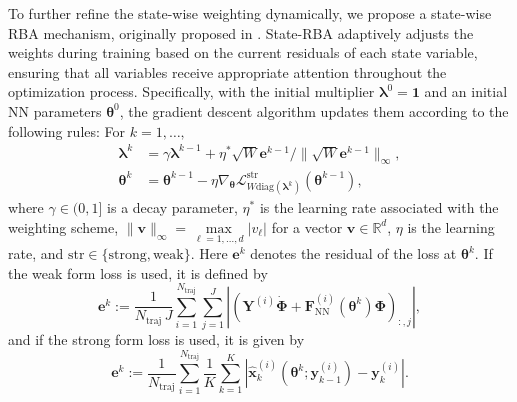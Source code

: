 \documentclass[final]{siamltex}
\newcommand{\bfa}[1]{\boldsymbol{#1}}
\begin{document}
To further refine the state-wise weighting dynamically, we propose a state-wise RBA mechanism, originally proposed in \cite{anagnostopoulos2024residual}. 
State-RBA adaptively adjusts the weights during training based on the current residuals of each state variable, ensuring that all variables receive appropriate attention throughout the optimization process. 
Specifically, with the initial multiplier $\bfa{\lambda}^{0} = \bm{1}$ and an initial NN parameters $\bfa{\theta}^0$, the gradient descent algorithm updates them according to the following rules: For $k=1,\dots,$
\begin{align*}
\bfa{\lambda}^{k}
    &=
    \gamma \bfa{\lambda}^{k-1}
    +
    \eta^{\ast}
    \sqrt{W}\bfa{e}^{k-1}/\|\sqrt{W}\bfa{e}^{k-1}\|_{\infty}, \\
    \bfa{\theta}^{k} &= \bfa{\theta}^{k-1} - \eta \nabla_{\bfa{\theta}} \mathcal{L}^{\textrm{str}}_{W\textrm{diag}(\bfa{\lambda}^{k})}(\bfa{\theta}^{k-1}),
\end{align*}
where $\gamma \in (0,1]$ is a decay parameter, $\eta^{\ast}$ is the learning rate associated with the weighting scheme,
$\| \bfa{v} \|_{\infty}
=
\max\limits_{\ell = 1,\dots,d} |v_\ell|$ for a vector $\bfa{v} \in \mathbb{R}^d$, 
$\eta$ is the learning rate, and
$\text{str} \in \{\text{strong}, \text{weak}\}$. 
Here $\bfa{e}^k$ denotes the residual of the loss at $\bfa{\theta}^k$.
If the weak form loss is used, it is defined by
\begin{equation*}
\label{eq:RBA_ei}
\bfa{e}^k
:=
\frac{1}{N_{\mathrm{traj}}\,J}
\sum_{i=1}^{N_{\mathrm{traj}}}
\sum_{j=1}^{J}
\left|
\left(
\bfa{Y}^{(i)}\dot{\bfa{\Phi}} + \bfa{F}_{\text{NN}}^{(i)}(\bfa{\theta}^k) \bfa{\Phi} 
\right)_{:, j}
\right|,
\end{equation*}
and if the strong form loss is used, it is given by
\begin{equation*} \label{eq:RBA_ei_gfinns}
\bfa{e}^k
:=  \frac{1}{N_{\text{traj}}} \sum\limits_{i=1}^{N_\text{traj}} \frac{1}{K} \sum\limits_{k=1}^{K} \left| \widehat{\bfa{x}}^{(i)}_k(\bfa{\theta}^k;\bfa{y}^{(i)}_{k-1}) - \bfa{y}^{(i)}_k\right|.
\end{equation*}
\end{document}
